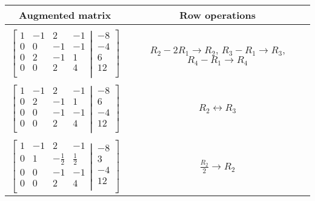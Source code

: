 \documentclass{article}
\begin{document}
    \begin{table}[h]
    	\centering
    	\begin{tabular}{c|c}
    	
    	 Augmented matrix & Row operations
    	 \\ 
    	 \hline    	 
    	 \\
    
    	$\left[
  \begin{matrix}
    1 & -1 & 2 & -1\\  
 0 & 0 & -1 & -1\\
 0 & 2 & -1 & 1\\
 0 & 0 & 2 & 4 \\
  \end{matrix}
  \left|
    \,
    \begin{matrix}
      -8  \\
      -4  \\
      6  \\
      12  \\
    \end{matrix}
  \right.
\right]$ & $R_{2} - 2R_{1}  \rightarrow R_{2}$, 	 $R_{3} - R_{1}  \rightarrow R_{3}$, 	$R_{4} - R_{1}  \rightarrow R_{4}$
\\
\\	
    	$\left[
  \begin{matrix}
    1 & -1 & 2 & -1\\  
 0 & 2 & -1 & 1\\
 0 & 0 & -1 & -1\\
 0 & 0 & 2 & 4 \\
  \end{matrix}
  \left|
    \,
    \begin{matrix}
      -8  \\
      6  \\
      -4  \\
      12  \\
    \end{matrix}
  \right.
\right]$ & $R_{2}   \leftrightarrow  R_{3}$
\\
\\

$\left[
  \begin{matrix}
    1 & -1 & 2 & -1\\  
 0 & 1 & -\frac{1}{2} & \frac{1}{2}\\
 0 & 0 & -1 & -1\\
 0 & 0 & 2 & 4 \\
  \end{matrix}
  \left|
    \,
    \begin{matrix}
      -8  \\
      3  \\
      -4  \\
      12  \\
    \end{matrix}
  \right.
\right]$ & $ \frac{R_{2}}{2}  \rightarrow R_{2}$


\end{tabular}
\end{table}
\end{document}
